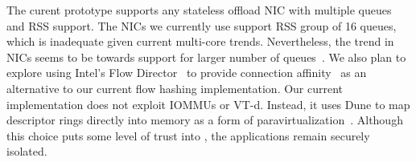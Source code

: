 

 The curent prototype
supports any stateless offload NIC with multiple queues and RSS
support. The NICs we currently use support RSS group of 16 queues,
which is inadequate given current multi-core trends. Nevertheless, the
trend in NICs seems to be towards support for larger number of
queues~\cite{refs,nsdi14}. We also plan to explore using Intel's Flow
Director~\cite{intel:82599} to provide connection
affinity~\cite{DBLP:conf/eurosys/PesterevSZM12} as an alternative to
our current flow hashing implementation. Our current implementation
does not exploit IOMMUs or VT-d. Instead, it uses Dune to map
descriptor rings directly into \ix memory as a form of
paravirtualization~\cite{DBLP:conf/sosp/BarhamDFHHHN03}.  Although
this choice puts some level of trust into \ix, the applications remain
securely isolated. %

